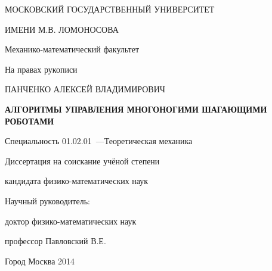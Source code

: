 \thispagestyle{empty}

\begin{center}
МОСКОВСКИЙ ГОСУДАРСТВЕННЫЙ УНИВЕРСИТЕТ\par
ИМЕНИ М.В. ЛОМОНОСОВА\par 
Механико-математический факультет\par
\par
\end{center}

\vspace{20mm}
\begin{flushright}
На правах рукописи

\end{flushright}

\vspace{30mm}
\begin{center}
{\large ПАНЧЕНКО АЛЕКСЕЙ ВЛАДИМИРОВИЧ}
\end{center}

\vspace{5mm}
\begin{center}
{\bf \large АЛГОРИТМЫ УПРАВЛЕНИЯ МНОГОНОГИМИ ШАГАЮЩИМИ РОБОТАМИ
\par}

\vspace{10mm}
{%
Специальность 01.02.01~---Теоретическая механика
}

\vspace{10mm}
Диссертация на соискание учёной степени

кандидата физико-математических наук
\end{center}

\vspace{20mm}
\begin{flushright}
Научный руководитель:

доктор физико-математических наук

профессор Павловский В.Е.

\end{flushright}

\vspace{20mm}
\begin{center}
{Город Москва 2014}
\end{center}

\newpage